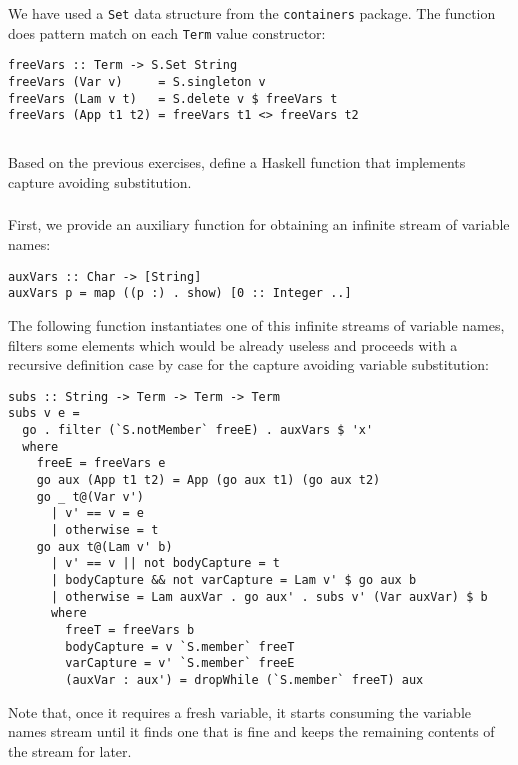 \documentclass{article}
\begin{document}
We have used a \verb|Set| data structure from the 
\verb|containers| package. The function does pattern
match on each \verb|Term| value constructor:

\begin{verbatim}
freeVars :: Term -> S.Set String
freeVars (Var v)     = S.singleton v
freeVars (Lam v t)   = S.delete v $ freeVars t
freeVars (App t1 t2) = freeVars t1 <> freeVars t2
\end{verbatim}

\subsection{}\label{ex:15}

Based on the previous exercises, define a Haskell function 
that implements capture avoiding substitution.

\subsubsection{}

First, we provide an auxiliary function for obtaining an 
infinite stream of variable names:

\begin{verbatim}
auxVars :: Char -> [String]
auxVars p = map ((p :) . show) [0 :: Integer ..]
\end{verbatim}

The following function instantiates one of this infinite 
streams of variable names, filters some elements which would 
be already useless and proceeds with a recursive definition 
case by case for the capture avoiding variable substitution:

\begin{verbatim}
subs :: String -> Term -> Term -> Term
subs v e =
  go . filter (`S.notMember` freeE) . auxVars $ 'x'
  where
    freeE = freeVars e
    go aux (App t1 t2) = App (go aux t1) (go aux t2)
    go _ t@(Var v')
      | v' == v = e
      | otherwise = t
    go aux t@(Lam v' b)
      | v' == v || not bodyCapture = t
      | bodyCapture && not varCapture = Lam v' $ go aux b
      | otherwise = Lam auxVar . go aux' . subs v' (Var auxVar) $ b
      where
        freeT = freeVars b
        bodyCapture = v `S.member` freeT
        varCapture = v' `S.member` freeE
        (auxVar : aux') = dropWhile (`S.member` freeT) aux
\end{verbatim}

Note that, once it requires a fresh variable, it starts consuming
the variable names stream until it finds one that is fine and keeps
the remaining contents of the stream for later.
\end{document}
